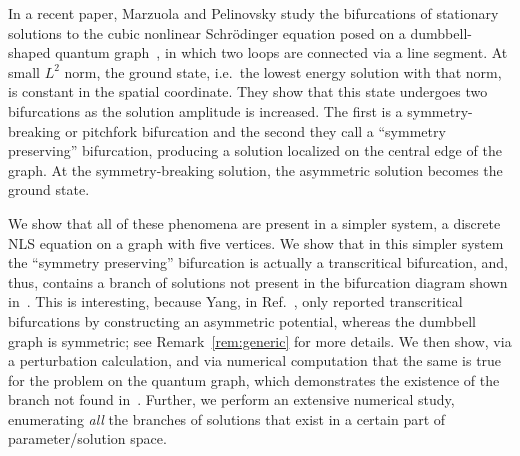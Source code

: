 \documentclass{article}
\numberwithin{equation}{section}
\numberwithin{figure}{section}
\begin{document}
In a recent paper, Marzuola and Pelinovsky study the bifurcations of stationary solutions to the cubic nonlinear Schr\"odinger equation posed on a dumbbell-shaped quantum graph~\cite{Marzuola:2016bl}, in which two loops are connected via a line segment. At small $L^2$ norm, the ground state, i.e.\ the lowest energy solution with that norm, is constant in the spatial coordinate. They show that this state undergoes two bifurcations as the solution amplitude is increased. The first is a symmetry-breaking or pitchfork bifurcation and the second they call a ``symmetry preserving'' bifurcation, producing a solution localized on the central edge of the graph. At the symmetry-breaking solution, the asymmetric solution becomes the ground state. 

We show that all of these phenomena are present in a simpler system, a discrete NLS equation on a graph with five vertices.  We show that in this simpler system the ``symmetry preserving'' bifurcation is actually a transcritical bifurcation, and, thus, contains a branch of solutions not present in the bifurcation diagram shown in~\cite{Marzuola:2016bl}. 
%
This is interesting, because Yang, in Ref.~\cite{Yang:2012ux}, only reported transcritical bifurcations by constructing an asymmetric potential, whereas the dumbbell graph is symmetric; see Remark~\ref{rem:generic} for more details.
%
We then show, via a perturbation calculation, and via numerical computation that the same is true for the problem on the quantum graph, which demonstrates the existence of the branch not found in~\cite{Marzuola:2016bl}. Further, we  perform an extensive numerical study, enumerating \emph{all} the branches of solutions that exist in a certain part of parameter/solution space.
\end{document}
